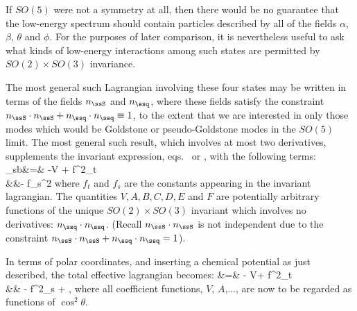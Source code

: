\documentclass[12pt]{report}
\def\nq{n_\ssq}
\def\ns{n_\ssS}
\def\sb{{\rm sb}}
\begin{document}
If $SO(5)$ were not a symmetry at all, then there would be
no guarantee that the low-energy spectrum should contain
particles described by all of the fields $\alpha$, $\beta$,
$\theta$ and 
$\phi$. For the purposes of later comparison, it is
nevertheless useful to ask what kinds of low-energy
interactions among such states are permitted by $SO(2)
\times SO(3)$ invariance.

The most general such Lagrangian involving these four
states may be written in terms of the fields $\ns$ and
$\nq$, where these fields satisfy the constraint $\ns\cdot
\ns + \nq \cdot \nq \equiv 1$, to the extent that we are
interested in only those modes which would be Goldstone or
pseudo-Goldstone modes in the $SO(5)$ limit. The most
general such result, which involves at most two
derivatives, supplements the invariant expression, 
eqs.~ or , with
the following terms:
%
\bg
\label{noninvform}
\Scl_\sb &=& -V + f^2_t \Bigl[ A 
\, \partial_t {\nq} \cdot  \partial_t {\nq} +
B \,\partial_t {\ns} \cdot
\partial_t {\ns} + C\,  (\nq \cdot \partial_t
\nq)^2 \Bigr] \nn\\
&&\qquad\qquad - f_s^2 \Bigl[ D \nabla_a {\nq}
\cdot \nabla_a {\nq} + E \nabla_a {\ns}
\cdot  \nabla_a {\ns} + F (\nq \cdot
\nabla_a \nq)^2 \Bigr] \nn
\nd
%
where $f_t$ and $f_s$ are the constants appearing in the
invariant lagrangian. The quantities $V, A, B, C, D, E$ and
$F$ are potentially arbitrary functions of the unique $SO(2)
\times SO(3)$ invariant which involves no derivatives: $\nq
\cdot \nq$. (Recall 
$\ns \cdot \ns$ is not independent due to the constraint
$\ns\cdot 
\ns + \nq \cdot \nq = 1$). 

In terms of polar coordinates, and inserting a chemical
potential as just described, the total effective lagrangian
becomes:
%
\bg
\label{kintermangles}
\Scl &=& - V+  {f^2_t }
 \nn\\
&& \qquad \qquad - {f^2_s }  + \cdots,\nn
\nd
%
where all coefficient functions, $V$, $A$,...\etc, are now
to be regarded as functions of $\cos^2\theta$.
\end{document}
